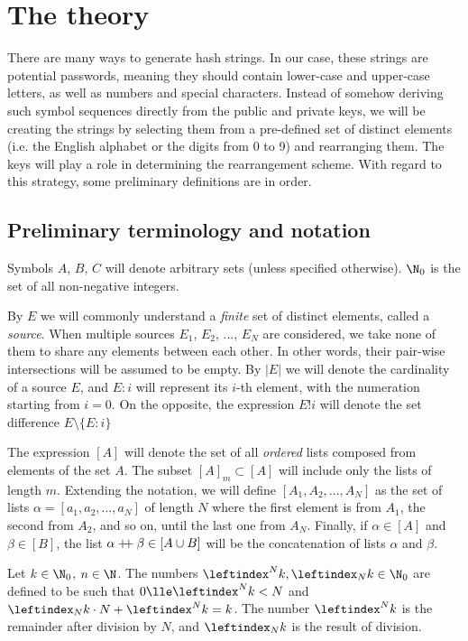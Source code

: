\documentclass[12pt, a4paper]{article}
\newcommand{\dop}{\mathbin{{+}\hspace{-1mm}{+}}}
\newcommand{\lli}[1]{\leftindex_{#1}}
\newcommand{\lui}[1]{\leftindex^{#1}}
\newcommand{\elt}{\mathop{:}}
\newcommand{\wo}{\mathop{!}}
\begin{document}
\section{The theory}

There are many ways to generate hash strings. In our case, these strings are potential passwords, meaning they should contain lower-case and upper-case letters, as well as numbers and special characters. Instead of somehow deriving such symbol sequences directly from the public and private keys, we will be creating the strings by selecting them from a pre-defined set of distinct elements (i.e. the English alphabet or the digits from 0 to 9) and rearranging them. The keys will play a role in determining the rearrangement scheme. With regard to this strategy, some preliminary definitions are in order.

\subsection{Preliminary terminology and notation}

Symbols $ A $, $ B $, $ C $ will denote arbitrary sets (unless specified otherwise). $ \N_0 $ is the set of all non-negative integers.

By $ E $ we will commonly understand a \emph{finite} set of distinct elements, called a \emph{source}. When multiple sources $ E_1 $, $ E_2 $, ..., $ E_N $ are considered, we take none of them to share any elements between each other. In other words, their pair-wise intersections will be assumed to be empty. By $ |E| $ we will denote the cardinality of a source $ E $, and $ E \elt i $ will represent its $ i $-th element, with the numeration starting from $ i = 0 $. On the opposite, the expression $ E \wo i $ will denote the set difference $ E \setminus \{E \elt i\} $

The expression $ [A] $ will denote the set of all \emph{ordered} lists composed from elements of the set $ A $. The subset $ [A]_m \subset [A] $ will include only the lists of length $ m $. Extending the notation, we will define $ [A_1, A_2, ..., A_N] $ as the set of lists $ \alpha = [a_1, a_2, ..., a_N] $ of length $ N $ where the first element is from $ A_1 $, the second from $ A_2 $, and so on, until the last one from $ A_N $. Finally, if $ \alpha \in [A] $ and $ \beta \in [B] $, the list $ \alpha \dop \beta \in [A \cup B] $ will be the concatenation of lists $ \alpha $ and $ \beta $.

Let $ k \in \N_0 $, $ n \in \N $. The numbers $ \lui{N}k, \lli{N}k \in \N_0 $ are defined to be such that $ 0 \lle \lui{N}k < N $ and $ \lli{N}k \cdot N + \lui{N}k = k $. The number $ \lui{N}k $ is the remainder after division by $ N $, and $ \lli{N}k $ is the result of division.
\end{document}
